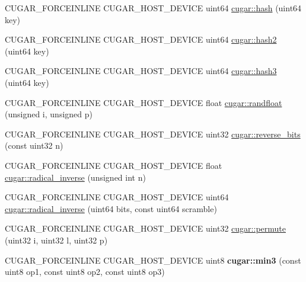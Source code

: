 \begin{DoxyCompactItemize}
\item 
C\+U\+G\+A\+R\+\_\+\+F\+O\+R\+C\+E\+I\+N\+L\+I\+NE C\+U\+G\+A\+R\+\_\+\+H\+O\+S\+T\+\_\+\+D\+E\+V\+I\+CE uint64 \hyperlink{group___basic_ga0dc531cb9c8f578fc90e08cbd390e4c2}{cugar\+::hash} (uint64 key)
\item 
C\+U\+G\+A\+R\+\_\+\+F\+O\+R\+C\+E\+I\+N\+L\+I\+NE C\+U\+G\+A\+R\+\_\+\+H\+O\+S\+T\+\_\+\+D\+E\+V\+I\+CE uint64 \hyperlink{group___basic_gaa6d53e12c691996cf8e9f853af40b83c}{cugar\+::hash2} (uint64 key)
\item 
C\+U\+G\+A\+R\+\_\+\+F\+O\+R\+C\+E\+I\+N\+L\+I\+NE C\+U\+G\+A\+R\+\_\+\+H\+O\+S\+T\+\_\+\+D\+E\+V\+I\+CE uint64 \hyperlink{group___basic_ga97e40904e3a80762d095028d2539137d}{cugar\+::hash3} (uint64 key)
\item 
C\+U\+G\+A\+R\+\_\+\+F\+O\+R\+C\+E\+I\+N\+L\+I\+NE C\+U\+G\+A\+R\+\_\+\+H\+O\+S\+T\+\_\+\+D\+E\+V\+I\+CE float \hyperlink{group___basic_ga215e28e8a87955931f3cdb9b9797ff68}{cugar\+::randfloat} (unsigned i, unsigned p)
\item 
C\+U\+G\+A\+R\+\_\+\+F\+O\+R\+C\+E\+I\+N\+L\+I\+NE C\+U\+G\+A\+R\+\_\+\+H\+O\+S\+T\+\_\+\+D\+E\+V\+I\+CE uint32 \hyperlink{group___basic_ga731aa073264ceb5396fc95800295bd0a}{cugar\+::reverse\+\_\+bits} (const uint32 n)
\item 
C\+U\+G\+A\+R\+\_\+\+F\+O\+R\+C\+E\+I\+N\+L\+I\+NE C\+U\+G\+A\+R\+\_\+\+H\+O\+S\+T\+\_\+\+D\+E\+V\+I\+CE float \hyperlink{group___basic_gae90dc4da8454b145d3307d6dadbc3c37}{cugar\+::radical\+\_\+inverse} (unsigned int n)
\item 
C\+U\+G\+A\+R\+\_\+\+F\+O\+R\+C\+E\+I\+N\+L\+I\+NE C\+U\+G\+A\+R\+\_\+\+H\+O\+S\+T\+\_\+\+D\+E\+V\+I\+CE uint64 \hyperlink{group___basic_ga1a2fbc282e52dbc566f9cc0515caf6de}{cugar\+::radical\+\_\+inverse} (uint64 bits, const uint64 scramble)
\item 
C\+U\+G\+A\+R\+\_\+\+F\+O\+R\+C\+E\+I\+N\+L\+I\+NE C\+U\+G\+A\+R\+\_\+\+H\+O\+S\+T\+\_\+\+D\+E\+V\+I\+CE uint32 \hyperlink{group___basic_gaa122cc1105ff380e14ba6a41f47dcc71}{cugar\+::permute} (uint32 i, uint32 l, uint32 p)
\item 
\mbox{\label{group___basic_ga13710bd2ca0aaef750afc087f88e0939}} 
C\+U\+G\+A\+R\+\_\+\+F\+O\+R\+C\+E\+I\+N\+L\+I\+NE C\+U\+G\+A\+R\+\_\+\+H\+O\+S\+T\+\_\+\+D\+E\+V\+I\+CE uint8 {\bfseries cugar\+::min3} (const uint8 op1, const uint8 op2, const uint8 op3)
\item 
\mbox{\label{group___basic_gad8fbb835dda3994cf16ff727f4e8a26c}} 

\end{DoxyCompactItemize}
